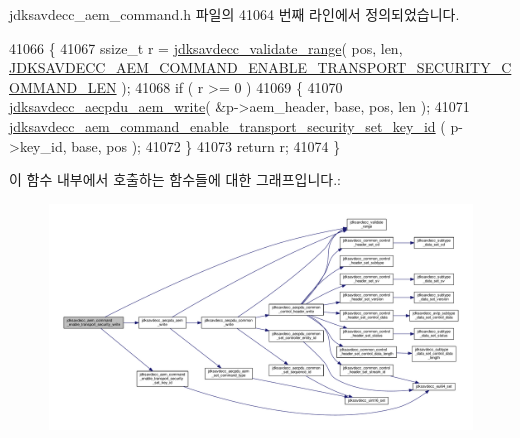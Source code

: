 jdksavdecc\+\_\+aem\+\_\+command.\+h 파일의 41064 번째 라인에서 정의되었습니다.


\begin{DoxyCode}
41066 \{
41067     ssize\_t r = \hyperlink{group__util_ga9c02bdfe76c69163647c3196db7a73a1}{jdksavdecc\_validate\_range}( pos, len, 
      \hyperlink{group__command__enable__transport__security_ga961cd8b2adbf6a8034688007a757eb5e}{JDKSAVDECC\_AEM\_COMMAND\_ENABLE\_TRANSPORT\_SECURITY\_COMMAND\_LEN}
       );
41068     \textcolor{keywordflow}{if} ( r >= 0 )
41069     \{
41070         \hyperlink{group__aecpdu__aem_gad658e55771cce77cecf7aae91e1dcbc5}{jdksavdecc\_aecpdu\_aem\_write}( &p->aem\_header, base, pos, len );
41071         \hyperlink{group__command__enable__transport__security_ga8a89dd4d54836be33b4bbe6c4eebdc1f}{jdksavdecc\_aem\_command\_enable\_transport\_security\_set\_key\_id}
      ( p->key\_id, base, pos );
41072     \}
41073     \textcolor{keywordflow}{return} r;
41074 \}
\end{DoxyCode}


이 함수 내부에서 호출하는 함수들에 대한 그래프입니다.\+:
\nopagebreak
\begin{figure}[H]
\begin{center}
\leavevmode
\includegraphics[width=350pt]{group__command__enable__transport__security_ga602cd36856a501c3e1f6234b78f5dd96_cgraph}
\end{center}
\end{figure}


